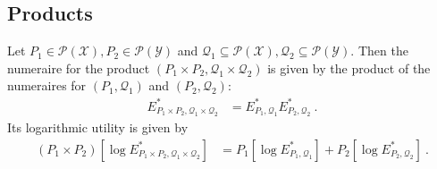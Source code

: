 


\subsection{Products}


\begin{theorem}\label{thm:numeraire_prod}
  \leanok
Let $P_1 \in \mathcal{P}(\mathcal{X}), P_2 \in \mathcal{P}(\mathcal{Y})$ and $\mathcal{Q}_1 \subseteq \mathcal{P}(\mathcal{X}), \mathcal{Q}_2 \subseteq \mathcal{P}(\mathcal{Y})$.
Then the numeraire for the product $(P_1 \times P_2, \mathcal{Q}_1 \times \mathcal{Q}_2)$ is given by the product of the numeraires for $(P_1, \mathcal{Q}_1)$ and $(P_2, \mathcal{Q}_2)$:
\begin{align*}
  E^*_{P_1 \times P_2, \mathcal{Q}_1 \times \mathcal{Q}_2}
  &= E^*_{P_1, \mathcal{Q}_1} E^*_{P_2, \mathcal{Q}_2}
  \: .
\end{align*}
Its logarithmic utility is given by
\begin{align*}
  (P_1 \times P_2)[\log E^*_{P_1 \times P_2, \mathcal{Q}_1 \times \mathcal{Q}_2}]
  &= P_1[\log E^*_{P_1, \mathcal{Q}_1}] + P_2[\log E^*_{P_2, \mathcal{Q}_2}]
  \: .
\end{align*}
\end{theorem}


